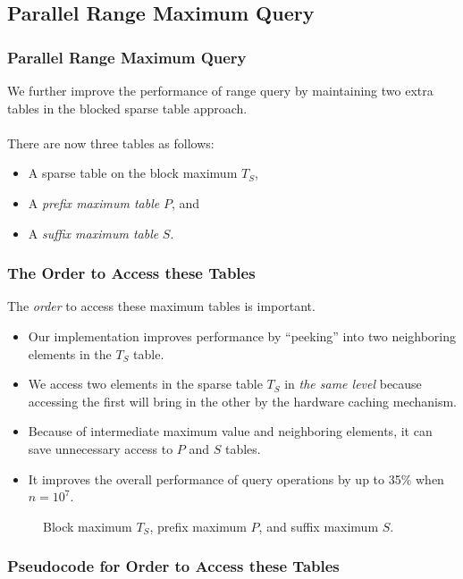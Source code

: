 \subsection{Parallel Range Maximum Query}
\begin{frame}
    \frametitle{Parallel Range Maximum Query}
    We further improve the performance of range query by maintaining two
	extra tables in the blocked sparse table approach.  
	\\~\\
	There are now three tables as follows:

	\begin{itemize}
		\setlength\itemsep{1em}
		\item
			A sparse table on the block maximum $T_S$, 
		\item
			A {\em prefix maximum table} $P$, and 
		\item
			A {\em suffix maximum table} $S$.
	\end{itemize}
\end{frame}

\begin{frame}
	\frametitle{The Order to Access these Tables}
	The {\em order} to access these maximum tables is important.
	\begin{itemize}
		\setlength\itemsep{1em}
		\item
			Our implementation improves performance by ``peeking'' into
			two neighboring elements in the $T_{S}$ table.
		\item 
			We access two elements in the sparse table $T_S$ in {\em the
  			same level} because accessing the first will bring in the
  			other by the hardware caching mechanism.
  		\item
  			Because of intermediate maximum value and neighboring
			elements, it can save unnecessary access to $P$ and $S$
			tables.
		\item
			It improves the overall performance of query operations by
			up to 35\% when $n = 10^7$.
	\end{itemize}
\end{frame}

\begin{frame}
	\begin{center}
	\scalebox{0.7} { \begin{minipage}{1.5\textwidth}
				\begin{figure}[!thb]
				  \centering {}  \caption{Block maximum $T_S$, prefix maximum $P$, and suffix
				    maximum $S$.}
				  \label{fig:compressed-sp-opt}
				\end{figure}
				\end{minipage}
		}
	\end{center}
\end{frame}

\begin{frame}
	\frametitle{Pseudocode for Order to Access these Tables}
	\begin{center}
	\scalebox{0.65} { \begin{minipage}{1.5\textwidth}
				
				\end{minipage}
		}
	\end{center}
\end{frame}